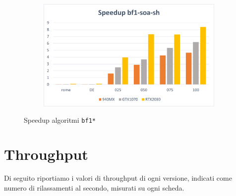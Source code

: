 \documentclass[12pt,a4paper]{book} %
\begin{document}
\begin{figure}[b]
\begin{subfigure}{.5\textwidth}
		\end{subfigure}%
		\begin{subfigure}{.5\textwidth}
			\centering
			\includegraphics[width=\textwidth]{speedup_bf1-soa-sh}
		\end{subfigure}
		\caption{Speedup algoritmi \texttt{bf1*}}
	\end{figure}
	
	\section{Throughput}
	Di seguito riportiamo i valori di throughput di ogni versione, indicati come numero di rilassamenti al secondo, misurati su ogni scheda.
	
\end{document}
